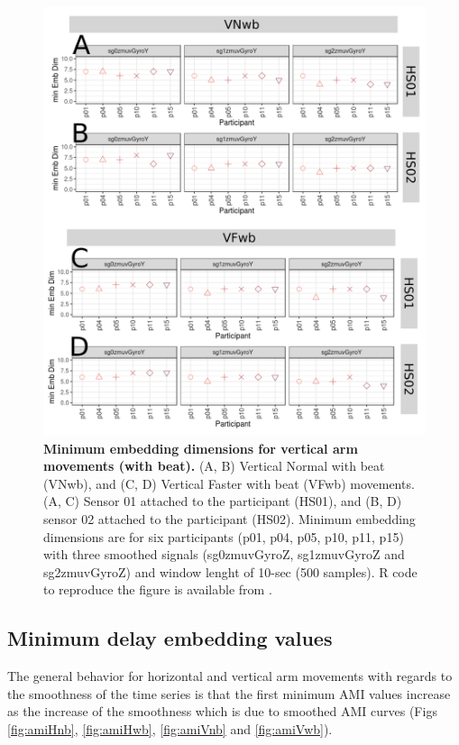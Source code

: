 \begin{figure}[!h]
\centering
\includegraphics[width=1.0\textwidth]{cao_Vwb_w10}
	\caption{
	{\bf Minimum embedding dimensions for vertical arm movements 
	(with beat).} 
		(A, B) Vertical Normal with beat (VNwb), and
		(C, D) Vertical Faster with beat (VFwb) movements.
		(A, C) Sensor 01 attached to the participant (HS01), and
		(B, D) sensor 02 attached to the participant (HS02).
		Minimum embedding dimensions are for six participants 
		(p01, p04, p05, p10, p11, p15) with three smoothed signals 
		(sg0zmuvGyroZ, sg1zmuvGyroZ and sg2zmuvGyroZ)
		and window lenght of 10-sec (500 samples).
		R code to reproduce the figure is available 
		from \cite{hwum2018}.
        }
    \label{fig:caoVwb}
\end{figure}




\subsection{Minimum delay embedding values}
The general behavior for horizontal and vertical arm movements with regards
to the smoothness of the time series is that the first minimum AMI values 
increase as the increase of the smoothness which is due to smoothed AMI 
curves 
(Figs \ref{fig:amiHnb}, \ref{fig:amiHwb}, \ref{fig:amiVnb} and 
\ref{fig:amiVwb}).

